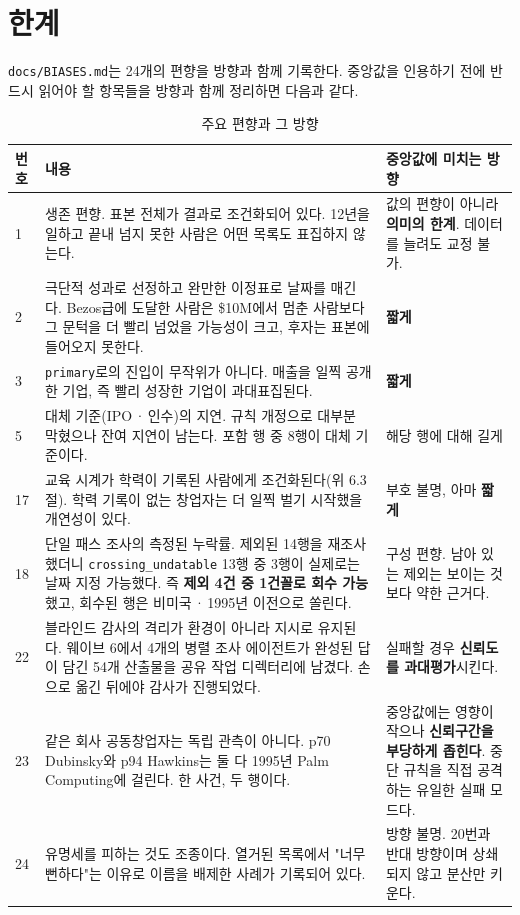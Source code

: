 \documentclass[11pt]{article}
\begin{document}
\section{한계}

\texttt{docs/BIASES.md}는 24개의 편향을 방향과 함께 기록한다.
중앙값을 인용하기 전에 반드시 읽어야 할 항목들을 방향과 함께 정리하면 다음과 같다.

\begin{table}[h]
\centering
\caption{주요 편향과 그 방향}
\begin{tabular}{p{0.8cm} p{7.6cm} p{5.6cm}}
\toprule
번호 & 내용 & 중앙값에 미치는 방향 \\
\midrule
1 & 생존 편향. 표본 전체가 결과로 조건화되어 있다. 12년을 일하고 끝내 넘지 못한 사람은 어떤 목록도 표집하지 않는다. & 값의 편향이 아니라 \textbf{의미의 한계}. 데이터를 늘려도 교정 불가. \\
2 & 극단적 성과로 선정하고 완만한 이정표로 날짜를 매긴다. Bezos급에 도달한 사람은 \$10M에서 멈춘 사람보다 그 문턱을 더 빨리 넘었을 가능성이 크고, 후자는 표본에 들어오지 못한다. & \textbf{짧게} \\
3 & \texttt{primary}로의 진입이 무작위가 아니다. 매출을 일찍 공개한 기업, 즉 빨리 성장한 기업이 과대표집된다. & \textbf{짧게} \\
5 & 대체 기준(IPO\,·\,인수)의 지연. 규칙 개정으로 대부분 막혔으나 잔여 지연이 남는다. 포함 행 중 8행이 대체 기준이다. & 해당 행에 대해 길게 \\
17 & 교육 시계가 학력이 기록된 사람에게 조건화된다(위 6.3절). 학력 기록이 없는 창업자는 더 일찍 벌기 시작했을 개연성이 있다. & 부호 불명, 아마 \textbf{짧게} \\
18 & 단일 패스 조사의 측정된 누락률. 제외된 14행을 재조사했더니 \texttt{crossing\_undatable} 13행 중 3행이 실제로는 날짜 지정 가능했다. 즉 \textbf{제외 4건 중 1건꼴로 회수 가능}했고, 회수된 행은 비미국\,·\,1995년 이전으로 쏠린다. & 구성 편향. 남아 있는 제외는 보이는 것보다 약한 근거다. \\
22 & 블라인드 감사의 격리가 환경이 아니라 지시로 유지된다. 웨이브 6에서 4개의 병렬 조사 에이전트가 완성된 답이 담긴 54개 산출물을 공유 작업 디렉터리에 남겼다. 손으로 옮긴 뒤에야 감사가 진행되었다. & 실패할 경우 \textbf{신뢰도를 과대평가}시킨다. \\
23 & 같은 회사 공동창업자는 독립 관측이 아니다. p70 Dubinsky와 p94 Hawkins는 둘 다 1995년 Palm Computing에 걸린다. 한 사건, 두 행이다. & 중앙값에는 영향이 작으나 \textbf{신뢰구간을 부당하게 좁힌다}. 중단 규칙을 직접 공격하는 유일한 실패 모드다. \\
24 & 유명세를 피하는 것도 조종이다. 열거된 목록에서 "너무 뻔하다"는 이유로 이름을 배제한 사례가 기록되어 있다. & 방향 불명. 20번과 반대 방향이며 상쇄되지 않고 분산만 키운다. \\
\bottomrule
\end{tabular}
\end{table}
\end{document}
